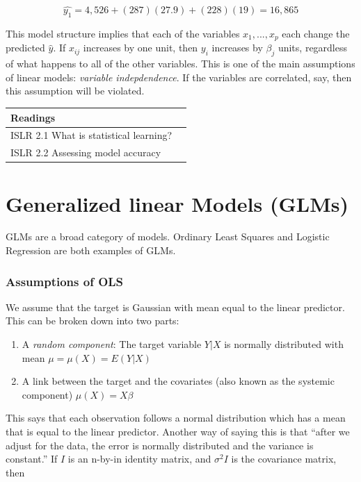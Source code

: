 \documentclass[openany]{book}
\begin{document}
\[\hat{y_1} = 4,526 + (287)(27.9) + (228)(19) = 16,865\]

This model structure implies that each of the variables \(x_1, ..., x_p\) each change the predicted \(\hat{y}\). If \(x_{ij}\) increases by one unit, then \(y_i\) increases by \(\beta_j\) units, regardless of what happens to all of the other variables. This is one of the main assumptions of linear models: \emph{variable indepdendence}. If the variables are correlated, say, then this assumption will be violated.

\begin{longtable}[]{@{}ll@{}}
\toprule
Readings &\tabularnewline
\midrule
\endhead
ISLR 2.1 What is statistical learning? &\tabularnewline
ISLR 2.2 Assessing model accuracy &\tabularnewline
\bottomrule
\end{longtable}

\hypertarget{generalized-linear-models-glms}{%
\chapter{Generalized linear Models (GLMs)}\label{generalized-linear-models-glms}}

GLMs are a broad category of models. Ordinary Least Squares and Logistic Regression are both examples of GLMs.

\hypertarget{assumptions-of-ols}{%
\subsection{Assumptions of OLS}\label{assumptions-of-ols}}

We assume that the target is Gaussian with mean equal to the linear predictor. This can be broken down into two parts:

\begin{enumerate}
\def\labelenumi{\arabic{enumi}.}
\item
  A \emph{random component}: The target variable \(Y|X\) is normally distributed with mean \(\mu = \mu(X) = E(Y|X)\)
\item
  A link between the target and the covariates (also known as the systemic component) \(\mu(X) = X\beta\)
\end{enumerate}

This says that each observation follows a normal distribution which has a mean that is equal to the linear predictor. Another way of saying this is that ``after we adjust for the data, the error is normally distributed and the variance is constant.'' If \(I\) is an n-by-in identity matrix, and \(\sigma^2 I\) is the covariance matrix, then
\end{document}
